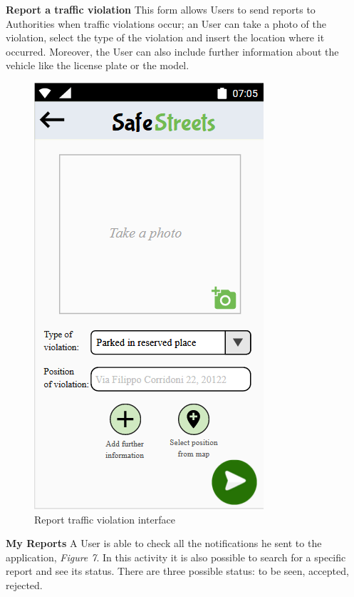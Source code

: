     \noindent\textbf{Report a traffic violation}\newline
    This form allows Users to send reports to Authorities when traffic violations occur; an User can take a photo of the violation, select the type of the violation and insert the location where it occurred. Moreover, the User can also include further information about the vehicle like the license plate or the model.
    \vspace{8mm}
    
     \begin{figure}[h]
        \centering
        \includegraphics[scale=1]{Images/report_violation.png}
        \caption{Report traffic violation interface}
    \end{figure}
    
    \newpage
    
    
     \noindent\textbf{My Reports}\newline
    A User is able to check all the notifications he sent to the application, \textit{Figure 7}. In this activity it is also possible to search for a specific report and see its status. There are three possible status: to be seen, accepted, rejected.
    
